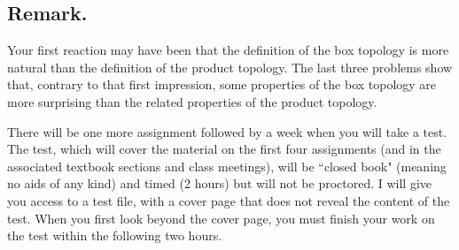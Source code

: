 \documentclass{amsart}
\theoremstyle{plain}
\theoremstyle{definition}
\theoremstyle{remark}
\begin{document}
\subsection*{Remark.} Your first reaction may have been that the definition of the box topology is more natural than the definition of the product topology. The last three problems show that, contrary to that first impression, some properties of the box topology are more surprising than the related properties of the product topology. 

\vspace{.2in}
There will be one more assignment followed by a week when you will take a test. The test, which will cover the material on the first four assignments (and in the associated textbook sections and class meetings), will be ``closed book" (meaning no aids of any kind) and timed (2 hours) but will not be proctored. I will give you access to a test file, with a cover page that does not reveal the content of the test. When you first look beyond the cover page, you must finish your work on the test within the following two hours. 

 
\end{document}
